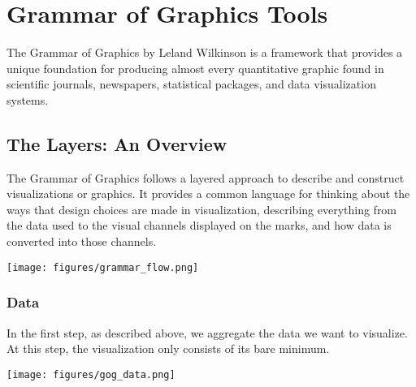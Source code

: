 \chapter{Grammar of Graphics Tools}
The Grammar of Graphics by Leland Wilkinson is a framework that provides a unique foundation for producing almost every quantitative graphic found in scientific journals, newspapers, statistical packages, and data visualization systems.

\section*{The Layers: An Overview}
\begin{minipage}[t]{0.6\textwidth}
    \vspace{0pt}
    The Grammar of Graphics follows a layered approach to describe and construct visualizations or graphics. 
    It provides a common language for thinking about the ways that design choices are made in visualization, describing everything from the data used to the visual channels displayed on the marks, and how data is converted into those channels.
    \hspace{1cm}
\end{minipage}
\begin{minipage}[t]{0.4\textwidth}
    \vspace{0pt}
    \texttt{[image: figures/grammar\_flow.png]}
\end{minipage}
\captionsetup{justification=centering}

\vspace{-3mm}

\subsection*{Data}
\vspace{-2mm}
\begin{minipage}[t]{0.7\textwidth}
    In the first step, as described above, we aggregate the data we want to visualize. At this step, the visualization only consists of its bare minimum.
    \hspace{1cm}
\end{minipage}
\begin{minipage}[t]{0.3\textwidth}
    \vspace{-20pt}
    \texttt{[image: figures/gog\_data.png]}
\end{minipage}


